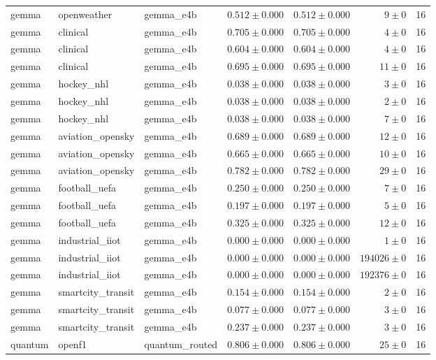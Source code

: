 \begin{table}[htbp]
\begin{tabular}{l l l r r r r}
gemma & openweather & gemma\_e4b & $0.512\pm0.000$ & $0.512\pm0.000$ & $9\pm0$ & 16 \\
gemma & clinical & gemma\_e4b & $0.705\pm0.000$ & $0.705\pm0.000$ & $4\pm0$ & 16 \\
gemma & clinical & gemma\_e4b & $0.604\pm0.000$ & $0.604\pm0.000$ & $4\pm0$ & 16 \\
gemma & clinical & gemma\_e4b & $0.695\pm0.000$ & $0.695\pm0.000$ & $11\pm0$ & 16 \\
gemma & hockey\_nhl & gemma\_e4b & $0.038\pm0.000$ & $0.038\pm0.000$ & $3\pm0$ & 16 \\
gemma & hockey\_nhl & gemma\_e4b & $0.038\pm0.000$ & $0.038\pm0.000$ & $2\pm0$ & 16 \\
gemma & hockey\_nhl & gemma\_e4b & $0.038\pm0.000$ & $0.038\pm0.000$ & $7\pm0$ & 16 \\
gemma & aviation\_opensky & gemma\_e4b & $0.689\pm0.000$ & $0.689\pm0.000$ & $12\pm0$ & 16 \\
gemma & aviation\_opensky & gemma\_e4b & $0.665\pm0.000$ & $0.665\pm0.000$ & $10\pm0$ & 16 \\
gemma & aviation\_opensky & gemma\_e4b & $0.782\pm0.000$ & $0.782\pm0.000$ & $29\pm0$ & 16 \\
gemma & football\_uefa & gemma\_e4b & $0.250\pm0.000$ & $0.250\pm0.000$ & $7\pm0$ & 16 \\
gemma & football\_uefa & gemma\_e4b & $0.197\pm0.000$ & $0.197\pm0.000$ & $5\pm0$ & 16 \\
gemma & football\_uefa & gemma\_e4b & $0.325\pm0.000$ & $0.325\pm0.000$ & $12\pm0$ & 16 \\
gemma & industrial\_iiot & gemma\_e4b & $0.000\pm0.000$ & $0.000\pm0.000$ & $1\pm0$ & 16 \\
gemma & industrial\_iiot & gemma\_e4b & $0.000\pm0.000$ & $0.000\pm0.000$ & $194026\pm0$ & 16 \\
gemma & industrial\_iiot & gemma\_e4b & $0.000\pm0.000$ & $0.000\pm0.000$ & $192376\pm0$ & 16 \\
gemma & smartcity\_transit & gemma\_e4b & $0.154\pm0.000$ & $0.154\pm0.000$ & $2\pm0$ & 16 \\
gemma & smartcity\_transit & gemma\_e4b & $0.077\pm0.000$ & $0.077\pm0.000$ & $3\pm0$ & 16 \\
gemma & smartcity\_transit & gemma\_e4b & $0.237\pm0.000$ & $0.237\pm0.000$ & $3\pm0$ & 16 \\
quantum & openf1 & quantum\_routed & $0.806\pm0.000$ & $0.806\pm0.000$ & $25\pm0$ & 16 \\

\end{tabular}
\end{table}
